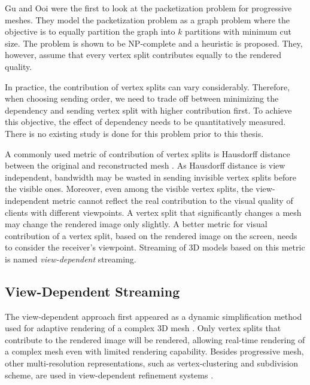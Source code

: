     Gu and Ooi \cite{Gu:Packetization} were the first to look at
    the packetization problem for progressive meshes.  They model
    the packetization problem as a graph problem where the objective
    is to equally partition the graph into $k$ partitions with minimum
    cut size.  The problem is shown to be NP-complete and a heuristic
    is proposed.  They, however, assume that every vertex split contributes 
    equally to the rendered quality.
    
    In practice, the contribution of vertex splits can
    vary considerably. Therefore, when choosing sending order, we
    need to trade off between minimizing the dependency and sending 
    vertex split with higher contribution first. To achieve this objective,
    the effect of dependency needs to be quantitatively measured.
    There is no existing study is done for this problem
    prior to this thesis.

    A commonly used metric of contribution of vertex splits is 
    Hausdorff distance between the original and reconstructed mesh \cite{cignoni98metro}.
    As Hausdorff distance is view independent, 
    bandwidth may be wasted in sending invisible vertex splits
    before the visible ones. Moreover, even among the visible vertex splits,
    the view-independent metric cannot reflect the real contribution to the visual quality of
    clients with different viewpoints. A vertex split that significantly
    changes a mesh may change the rendered image 
    only slightly.  A better metric for visual contribution of a vertex split,
    based on the rendered image on the screen, 
    needs to consider the receiver's viewpoint.
    Streaming of 3D models based on this metric is named \emph{view-dependent} streaming.

    \subsection{View-Dependent Streaming}
    The view-dependent approach first appeared as 
    a dynamic simplification method used for adaptive rendering of a complex 3D mesh
    \cite{258843, 258847}. Only vertex splits that contribute to the rendered
    image will be rendered, allowing real-time rendering of a complex mesh
    even with limited rendering capability.
    Besides progressive mesh, other multi-resolution representations, 
    such as vertex-clustering  and subdivision scheme,
    are used in view-dependent refinement systems \cite{245627, efficient:Alliez,602344}.


